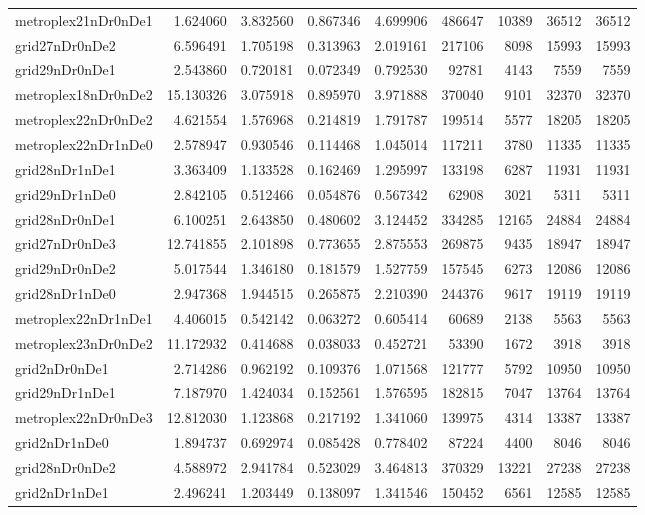\documentclass[../../../thesis.tex]{subfiles}
\begin{document}
\begin{longtable}{|l|r|r|r|r|r|r|r|r|}
metroplex21nDr0nDe1 & 1.624060 & 3.832560 & 0.867346 & 4.699906 & 486647 & 10389 & 36512 & 36512 \\
grid27nDr0nDe2 & 6.596491 & 1.705198 & 0.313963 & 2.019161 & 217106 & 8098 & 15993 & 15993 \\
grid29nDr0nDe1 & 2.543860 & 0.720181 & 0.072349 & 0.792530 & 92781 & 4143 & 7559 & 7559 \\
metroplex18nDr0nDe2 & 15.130326 & 3.075918 & 0.895970 & 3.971888 & 370040 & 9101 & 32370 & 32370 \\
metroplex22nDr0nDe2 & 4.621554 & 1.576968 & 0.214819 & 1.791787 & 199514 & 5577 & 18205 & 18205 \\
metroplex22nDr1nDe0 & 2.578947 & 0.930546 & 0.114468 & 1.045014 & 117211 & 3780 & 11335 & 11335 \\
grid28nDr1nDe1 & 3.363409 & 1.133528 & 0.162469 & 1.295997 & 133198 & 6287 & 11931 & 11931 \\
grid29nDr1nDe0 & 2.842105 & 0.512466 & 0.054876 & 0.567342 & 62908 & 3021 & 5311 & 5311 \\
grid28nDr0nDe1 & 6.100251 & 2.643850 & 0.480602 & 3.124452 & 334285 & 12165 & 24884 & 24884 \\
grid27nDr0nDe3 & 12.741855 & 2.101898 & 0.773655 & 2.875553 & 269875 & 9435 & 18947 & 18947 \\
grid29nDr0nDe2 & 5.017544 & 1.346180 & 0.181579 & 1.527759 & 157545 & 6273 & 12086 & 12086 \\
grid28nDr1nDe0 & 2.947368 & 1.944515 & 0.265875 & 2.210390 & 244376 & 9617 & 19119 & 19119 \\
metroplex22nDr1nDe1 & 4.406015 & 0.542142 & 0.063272 & 0.605414 & 60689 & 2138 & 5563 & 5563 \\
metroplex23nDr0nDe2 & 11.172932 & 0.414688 & 0.038033 & 0.452721 & 53390 & 1672 & 3918 & 3918 \\
grid2nDr0nDe1 & 2.714286 & 0.962192 & 0.109376 & 1.071568 & 121777 & 5792 & 10950 & 10950 \\
grid29nDr1nDe1 & 7.187970 & 1.424034 & 0.152561 & 1.576595 & 182815 & 7047 & 13764 & 13764 \\
metroplex22nDr0nDe3 & 12.812030 & 1.123868 & 0.217192 & 1.341060 & 139975 & 4314 & 13387 & 13387 \\
grid2nDr1nDe0 & 1.894737 & 0.692974 & 0.085428 & 0.778402 & 87224 & 4400 & 8046 & 8046 \\
grid28nDr0nDe2 & 4.588972 & 2.941784 & 0.523029 & 3.464813 & 370329 & 13221 & 27238 & 27238 \\
grid2nDr1nDe1 & 2.496241 & 1.203449 & 0.138097 & 1.341546 & 150452 & 6561 & 12585 & 12585 \\

\end{longtable}
\end{document}
